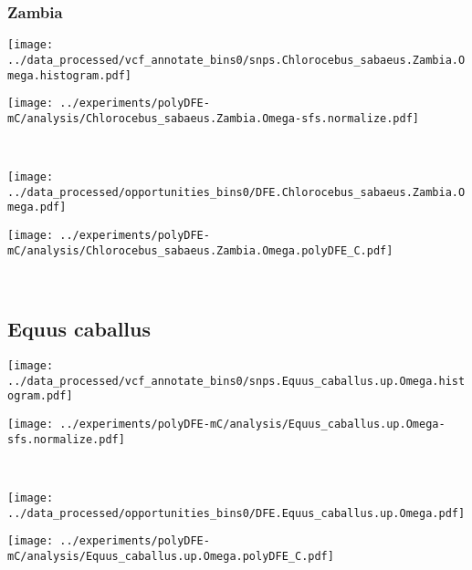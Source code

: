 \subsubsection{Zambia}

\begin{minipage}{0.49\linewidth}
    \texttt{[image: ../data\_processed/vcf\_annotate\_bins0/snps.Chlorocebus\_sabaeus.Zambia.Omega.histogram.pdf]}
\end{minipage}
\begin{minipage}{0.49\linewidth}
    \texttt{[image: ../experiments/polyDFE-mC/analysis/Chlorocebus\_sabaeus.Zambia.Omega-sfs.normalize.pdf]}
\end{minipage}
\\
\begin{minipage}{0.49\linewidth}
    \texttt{[image: ../data\_processed/opportunities\_bins0/DFE.Chlorocebus\_sabaeus.Zambia.Omega.pdf]}
\end{minipage}
\begin{minipage}{0.49\linewidth}
    \texttt{[image: ../experiments/polyDFE-mC/analysis/Chlorocebus\_sabaeus.Zambia.Omega.polyDFE\_C.pdf]}
\end{minipage}
\\

\subsection{Equus caballus}

\begin{minipage}{0.49\linewidth}
    \texttt{[image: ../data\_processed/vcf\_annotate\_bins0/snps.Equus\_caballus.up.Omega.histogram.pdf]}
\end{minipage}
\begin{minipage}{0.49\linewidth}
    \texttt{[image: ../experiments/polyDFE-mC/analysis/Equus\_caballus.up.Omega-sfs.normalize.pdf]}
\end{minipage}
\\
\begin{minipage}{0.49\linewidth}
    \texttt{[image: ../data\_processed/opportunities\_bins0/DFE.Equus\_caballus.up.Omega.pdf]}
\end{minipage}
\begin{minipage}{0.49\linewidth}
    \texttt{[image: ../experiments/polyDFE-mC/analysis/Equus\_caballus.up.Omega.polyDFE\_C.pdf]}
\end{minipage}
\\

